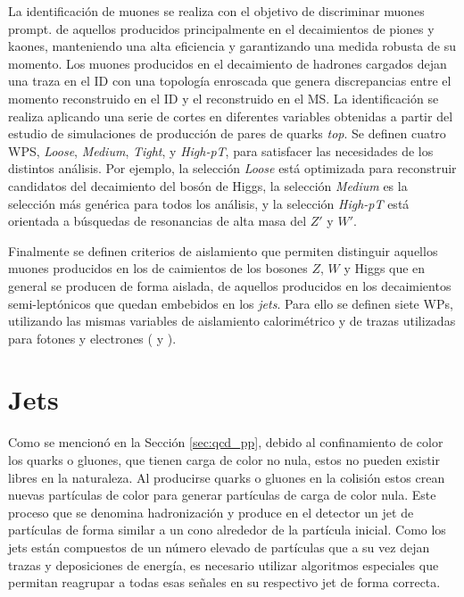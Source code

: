 La identificación de muones se realiza con el objetivo de discriminar muones prompt. de aquellos producidos principalmente en el decaimientos de piones y kaones, manteniendo una alta eficiencia y garantizando una medida robusta de su momento. Los muones producidos en el decaimiento de hadrones cargados dejan una traza en el ID con una topología enroscada 
que genera discrepancias entre el momento reconstruido en el ID y el reconstruido en el MS. La identificación se realiza aplicando una serie de cortes en diferentes variables \cite{PERF-2015-10} obtenidas a partir del estudio de simulaciones de producción de pares de quarks \textit{top}. Se definen cuatro WPS, \textit{Loose}, \textit{Medium}, \textit{Tight}, y \textit{High-pT}, para satisfacer las necesidades de los distintos análisis. Por ejemplo, la selección \textit{Loose} está optimizada para reconstruir candidatos del decaimiento del bosón de Higgs, la selección \textit{Medium} es la selección más genérica para todos los análisis, y la selección \textit{High-pT} está orientada a búsquedas de resonancias de alta masa del $Z'$ y $W'$. 

Finalmente se definen criterios de aislamiento que permiten distinguir aquellos muones producidos en los de caimientos de los bosones $Z$, $W$ y Higgs que en general se producen de forma aislada, de aquellos producidos en los decaimientos semi-leptónicos que quedan embebidos en los \textit{jets}. Para ello se definen siete WPs, utilizando las mismas variables de aislamiento calorimétrico y de trazas utilizadas para fotones y electrones ( y ). 


\section{Jets}

Como se mencionó en la Sección \ref{sec:qcd_pp}, debido al confinamiento de color los quarks o gluones, que tienen carga de color no nula, estos no pueden existir libres en la naturaleza. Al producirse quarks o gluones en la colisión estos crean nuevas partículas de color para generar partículas de carga de color nula. Este proceso que se denomina hadronización y produce en el detector un jet de partículas de forma similar a un cono alrededor de la partícula inicial. Como los jets están compuestos de un número elevado de partículas que a su vez dejan trazas y deposiciones de energía, es necesario utilizar algoritmos especiales que permitan reagrupar a todas esas señales en su respectivo jet de forma correcta.

